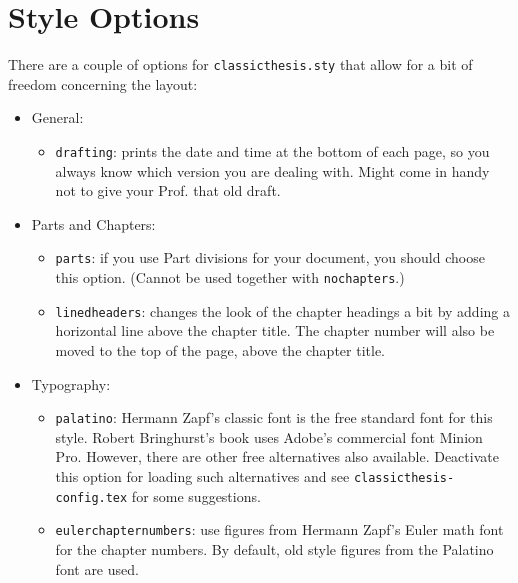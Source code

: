 \clearpage
\section{Style Options}\label{sec:options}
There are a couple of options for \texttt{classicthesis.sty} that
allow for a bit of freedom concerning the layout:
\begin{itemize}
    \item General:
        \begin{itemize}
            \item\texttt{drafting}: prints the date and time at the bottom of
            each page, so you always know which version you are dealing with.
            Might come in handy not to give your Prof. that old draft.
        \end{itemize}

    \item Parts and Chapters:
        \begin{itemize}
            \item\texttt{parts}: if you use Part divisions for your document,
            you should choose this option. (Cannot be used together with
            \texttt{nochapters}.)

            \item\texttt{linedheaders}: changes the look of the chapter
            headings a bit by adding a horizontal line above the chapter
            title. The chapter number will also be moved to the top of the
            page, above the chapter title.
        \end{itemize}

    \item Typography:
        \begin{itemize}
            \item\texttt{palatino}: Hermann Zapf's classic font is the free standard font for this style. Robert Bringhurst's book uses Adobe's commercial font Minion Pro. However, there are other free alternatives also available. Deactivate this option for loading such alternatives and see \texttt{classicthesis-config.tex} for some suggestions.

            \item\texttt{eulerchapternumbers}: use figures from Hermann Zapf's
            Euler math font for the chapter numbers. By default, old style
            figures from the Palatino font are used.


\end{itemize}
\end{itemize}
